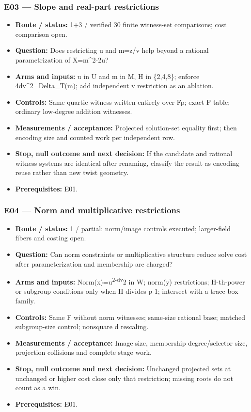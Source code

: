 \documentclass[
  10pt,
]{article}
\providecommand{\tightlist}{%
  \setlength{\itemsep}{0pt}\setlength{\parskip}{0pt}}
\begin{document}
\subsubsection{E03 --- Slope and real-part
restrictions}\label{e03-slope-and-real-part-restrictions}

\begin{itemize}
\tightlist
\item
  \textbf{Route / status:} 1+3 / verified 30 finite witness-set
  comparisons; cost comparison open.
\item
  \textbf{Question:} Does restricting u and m=z/v help beyond a rational
  parametrization of X=m\^{}2-2u?
\item
  \textbf{Arms and inputs:} u in U and m in M, H in \{2,4,8\}; enforce
  4dv\^{}2=Delta\_T(m); add independent v restriction as an ablation.
\item
  \textbf{Controls:} Same quartic witness written entirely over Fp;
  exact-F table; ordinary low-degree addition witnesses.
\item
  \textbf{Measurements / acceptance:} Projected solution-set equality
  first; then encoding size and counted work per independent row.
\item
  \textbf{Stop, null outcome and next decision:} If the candidate and
  rational witness systems are identical after renaming, classify the
  result as encoding reuse rather than new twist geometry.
\item
  \textbf{Prerequisites:} E01.
\end{itemize}

\subsubsection{E04 --- Norm and multiplicative
restrictions}\label{e04-norm-and-multiplicative-restrictions}

\begin{itemize}
\tightlist
\item
  \textbf{Route / status:} 1 / partial: norm/image controls executed;
  larger-field fibers and costing open.
\item
  \textbf{Question:} Can norm constraints or multiplicative structure
  reduce solve cost after parameterization and membership are charged?
\item
  \textbf{Arms and inputs:} Norm(x)=u\textsuperscript{2-dv}2 in W;
  norm(y) restrictions; H-th-power or subgroup conditions only when H
  divides p-1; intersect with a trace-box family.
\item
  \textbf{Controls:} Same F without norm witnesses; same-size rational
  base; matched subgroup-size control; nonsquare d rescaling.
\item
  \textbf{Measurements / acceptance:} Image size, membership
  degree/selector size, projection collisions and complete stage work.
\item
  \textbf{Stop, null outcome and next decision:} Unchanged projected
  sets at unchanged or higher cost close only that restriction; missing
  roots do not count as a win.
\item
  \textbf{Prerequisites:} E01.
\end{itemize}
\end{document}
